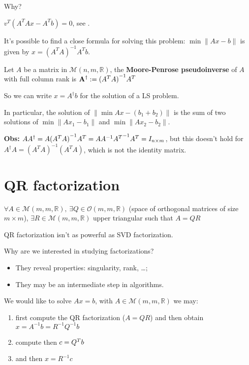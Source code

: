 \documentclass[computationalMathematics.tex]{subfiles}
\begin{document}
Why?

$v^T({A}^{T}Ax - {A}^{T}b) = 0$, see .


It's possible to find a close formula for solving this problem: $\min\|Ax-b\|$ is given by $x={({A}^{T}A)}^{-1}{A}^{T}b$.

\begin{definition}
  Let $A$ be a matrix in $\mathcal{M}(n, m, \mathds{R})$, the \textbf{Moore-Penrose pseudoinverse} of $A$ with full column rank is ${\bf {A}^{\dag}} := {({A}^{T}A)}^{-1}{A}^{T}$
\end{definition}

So we can write $x={A}^{\dag}b$ for the solution of a LS problem.

In particular, the solution of $\|\min Ax - ({b}_{1} + {b}_{2})\|$ is the sum of two solutions of $\min \| A{x}_{1} -b_{1} \|$ and  $\min \| A{x}_{2} -b_{2} \|$.

\textbf{Obs:} $A{A}^{\dag} = A {({A}^{T}A)}^{-1} {A}^{T} = A {A}^{-1} {{A}^{T}}^{-1} {A}^{T} = I_{n \times m}$, but this doesn't hold for ${A}^{\dag}A = {({A}^{T}A)}^{-1}({A}^{T}A)$, which is not the identity matrix.

\section{QR factorization}

\begin{theorem}
  $\forall A \in \mathcal{M}(m, m, \mathds{R}),~ \exists  Q \in \mathcal{O}(m, m, \mathds{R})$ (space of orthogonal matrices of size $m\times m$), $\exists R \in \mathcal{M}(m, m, \mathds{R})$ upper triangular such that $A=QR$
\end{theorem}

QR factorization isn't as powerful as SVD factorization.

Why are we interested in studying factorizations?

\begin{itemize}
  \item They reveal properties: singularity, rank, \dots;
  \item They may be an intermediate step in algorithms.
\end{itemize}

\begin{example}
  We would like to solve $Ax=b$, with $A \in \mathcal{M}(m, m, \mathds{R})$ we may:

\begin{enumerate}
  \item first compute the QR factorization ($A=QR$) and then obtain 
$x={A}^{-1}b={R}^{-1}{Q}^{-1}b$
  \item compute then $c= {Q}^{T}b$
  \item and then $x={R}^{-1}c$
\end{enumerate}
\end{example}
\end{document}
